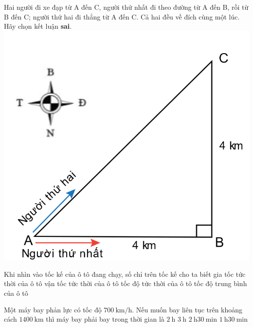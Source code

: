 \begin{ex}

Hai người đi xe đạp từ A đến C, người thứ nhất đi theo đường từ A đến B, rồi từ B đến C; người thứ hai đi thẳng từ A đến C. Cả hai đều về đích cùng một lúc.\\
Hãy chọn kết luận \textbf{sai}.	
	{
		\includegraphics[width=0.5\linewidth]{figs/VN10-2022-PH-TP004-P-3}
	}
	\loigiai{}
	
\end{ex}
\begin{ex}
	Khi nhìn vào tốc kế của ô tô đang chạy, số chỉ trên tốc kế cho ta biết
	\choice
	{gia tốc tức thời của ô tô}
	{vận tốc tức thời của ô tô}
	{\True tốc độ tức thời của ô tô}
	{tốc độ trung bình của ô tô}
	\loigiai{}
\end{ex}
\begin{ex}
	Một máy bay phản lực có tốc độ $\SI{700}{\kilo\meter/\hour}$. Nếu muốn bay liên tục trên khoảng cách $\SI{1400}{\kilo\meter}$ thì máy bay phải bay trong thời gian là
	\choice
	{\True $\SI{2}{\hour}$}
	{$\SI{3}{\hour}$}
	{$\SI{2}{\hour}\SI{30}{\minute}$}
	{$\SI{1}{\hour}\SI{30}{\minute}$}
\end{ex}
